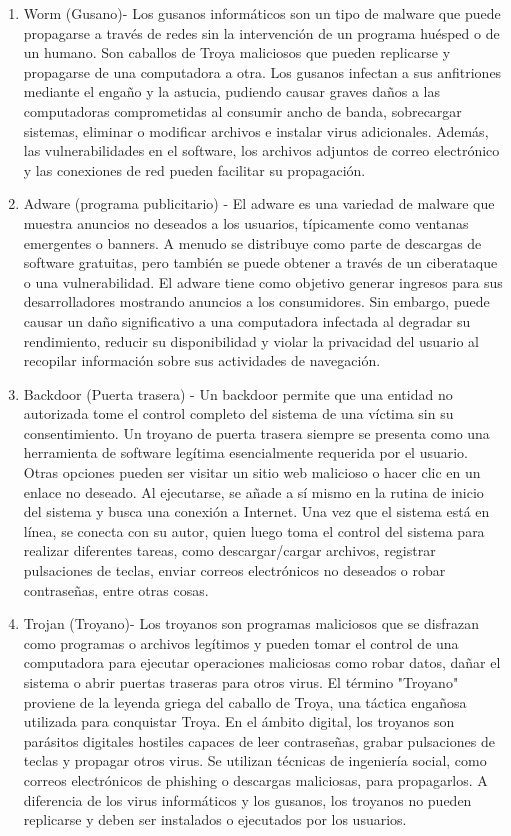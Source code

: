 \begin{enumerate}

\item Worm (Gusano)- Los gusanos informáticos son un tipo de malware que puede propagarse a través de redes sin la intervención de un programa huésped o de un humano. Son caballos de Troya maliciosos que pueden replicarse y propagarse de una computadora a otra. Los gusanos infectan a sus anfitriones mediante el engaño y la astucia, pudiendo causar graves daños a las computadoras comprometidas al consumir ancho de banda, sobrecargar sistemas, eliminar o modificar archivos e instalar virus adicionales. Además, las vulnerabilidades en el software, los archivos adjuntos de correo electrónico y las conexiones de red pueden facilitar su propagación. 

\item Adware (programa publicitario) - El adware es una variedad de malware que muestra anuncios no deseados a los usuarios, típicamente como ventanas emergentes o banners. A menudo se distribuye como parte de descargas de software gratuitas, pero también se puede obtener a través de un ciberataque o una vulnerabilidad. El adware tiene como objetivo generar ingresos para sus desarrolladores mostrando anuncios a los consumidores. Sin embargo, puede causar un daño significativo a una computadora infectada al degradar su rendimiento, reducir su disponibilidad y violar la privacidad del usuario al recopilar información sobre sus actividades de navegación.

\item Backdoor (Puerta trasera) - Un backdoor permite que una entidad no autorizada tome el control completo del sistema de una víctima sin su consentimiento. Un troyano de puerta trasera siempre se presenta como una herramienta de software legítima esencialmente requerida por el usuario. Otras opciones pueden ser visitar un sitio web malicioso o hacer clic en un enlace no deseado. Al ejecutarse, se añade a sí mismo en la rutina de inicio del sistema y busca una conexión a Internet. Una vez que el sistema está en línea, se conecta con su autor, quien luego toma el control del sistema para realizar diferentes tareas, como descargar/cargar archivos, registrar pulsaciones de teclas, enviar correos electrónicos no deseados o robar contraseñas, entre otras cosas.

\item Trojan (Troyano)- Los troyanos son programas maliciosos que se disfrazan como programas o archivos legítimos y pueden tomar el control de una computadora para ejecutar operaciones maliciosas como robar datos, dañar el sistema o abrir puertas traseras para otros virus. El término "Troyano" proviene de la leyenda griega del caballo de Troya, una táctica engañosa utilizada para conquistar Troya. En el ámbito digital, los troyanos son parásitos digitales hostiles capaces de leer contraseñas, grabar pulsaciones de teclas y propagar otros virus. Se utilizan técnicas de ingeniería social, como correos electrónicos de phishing o descargas maliciosas, para propagarlos. A diferencia de los virus informáticos y los gusanos, los troyanos no pueden replicarse y deben ser instalados o ejecutados por los usuarios.


\end{enumerate}
